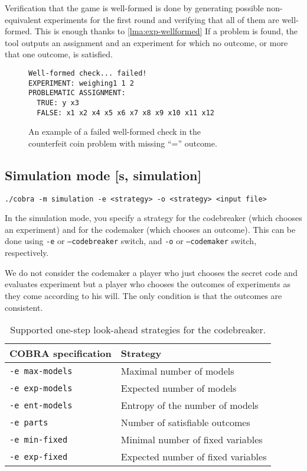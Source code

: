 Verification that the game is well-formed is done by
  generating possible non-equivalent experiments for the first round
  and verifying that all of them are well-formed.
This is enough thanks to \autoref{lma:exp-wellformed}
If a problem is found, the tool outputs an assignment and an experiment
  for which no outcome, or more that one outcome, is satisfied.

\begin{figure}
\begin{lstlisting}[xleftmargin=.2\textwidth]
Well-formed check... failed!
EXPERIMENT: weighing1 1 2
PROBLEMATIC ASSIGNMENT:
  TRUE: y x3
  FALSE: x1 x2 x4 x5 x6 x7 x8 x9 x10 x11 x12
\end{lstlisting}
\caption{An example of a failed well-formed check in the\\ counterfeit coin problem
 with missing ``='' outcome.}
\end{figure}

\subsection{Simulation mode [s, simulation]}

\centerline{\texttt{./cobra -m simulation -e <strategy> -o <strategy> <input file> }}

In the simulation mode, you specify a strategy for
  the codebreaker (which chooses an experiment) and for the codemaker
   (which chooses an outcome).
This can be done using \texttt{-e} or \texttt{--codebreaker} switch, and
\texttt{-o} or \texttt{--codemaker} switch, respectively.

We do not consider the codemaker a player who just chooses the secret code
and evaluates experiment but a player who chooses the outcomes
of experiments as they come according to his will.
The only condition is that the outcomes are consistent.

\begin{table}[h]
\begin{center}
\begin{tabular}{|l|p{7cm}|} \hline
COBRA specification & Strategy \\\hline
 \texttt{-e max-models} & Maximal number of models \\
\texttt{-e exp-models} & Expected number of models \\
\texttt{-e ent-models} & Entropy of the number of models \\
\texttt{-e parts} & Number of satisfiable outcomes \\
\texttt{-e min-fixed} & Minimal number of fixed variables \\
\texttt{-e exp-fixed} & Expected number of fixed variables \\\hline
\end{tabular}
\caption{Supported one-step look-ahead strategies for the codebreaker.} \label{tbl:stge}
\end{center}
\end{table}

